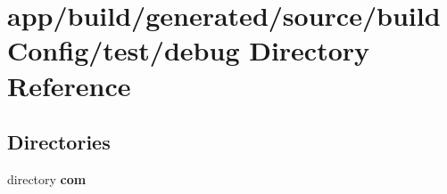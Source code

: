 \section{app/build/generated/source/build\+Config/test/debug Directory Reference}
\label{dir_c1203dfea5c51844ee28357a7883a08c}
\subsection*{Directories}
\begin{DoxyCompactItemize}
\item 
directory {\bf com}
\end{DoxyCompactItemize}
